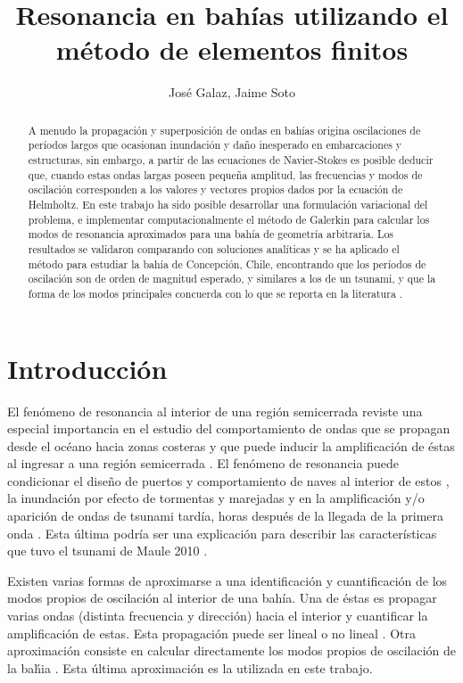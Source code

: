 \documentclass[12pt, letterpaper]{article}
\title{Resonancia en bah\'ias utilizando el m\'etodo de elementos finitos}
\author{Jos\'e Galaz, Jaime Soto}
\date{}
\begin{document}
\maketitle

\begin{abstract}
    A menudo la propagaci\'on y superposici\'on de ondas en bah\'ias origina oscilaciones de per\'iodos largos que ocasionan inundaci\'on y da\~no inesperado en embarcaciones y estructuras, sin embargo, a partir de las ecuaciones de Navier-Stokes es posible deducir que, cuando estas ondas largas poseen peque\~na amplitud, las frecuencias y modos de oscilaci\'on corresponden a los valores y vectores propios dados por la ecuaci\'on de Helmholtz. En este trabajo ha sido posible desarrollar una formulaci\'on variacional del problema, e implementar computacionalmente el m\'etodo de Galerkin para calcular los modos de resonancia aproximados para una bah\'ia de geometr\'ia arbitraria. Los resultados se validaron comparando con soluciones anal\'iticas y se ha aplicado el m\'etodo para estudiar la bah\'ia de Concepci\'on, Chile, encontrando que los per\'iodos de oscilaci\'on son de orden de magnitud esperado, y similares a los de un tsunami, y que la forma de los modos principales concuerda con lo que se reporta en la literatura \cite{Belloti2012}.
\end{abstract}

\section{Introducci\'on}

El fen\'omeno de resonancia al interior de una regi\'on  semicerrada reviste una especial importancia en el estudio del comportamiento de ondas que se propagan desde el oc\'eano hacia zonas costeras y que puede inducir la amplificaci\'on de \'estas al ingresar a una regi\'on semicerrada \cite{Kowalik1993}. El fen\'omeno de resonancia puede condicionar el dise\~no de puertos y comportamiento de naves al interior de estos \cite{Diaz2006web}, la inundaci\'on por efecto de tormentas y marejadas \cite{Kowalik1993} y en la amplificaci\'on y/o aparici\'on de ondas de tsunami tard\'ia, horas despu\'es de la llegada de la primera onda \cite{Kowalik1993}. Esta \'ultima podr\'ia ser una explicaci\'on para describir las caracter\'isticas que tuvo el tsunami de Maule 2010 \cite{Cyper2012web}.

Existen varias formas de aproximarse a una identificaci\'on y cuantificaci\'on de los modos propios de oscilaci\'on al interior de una bah\'ia. Una de \'estas es propagar varias ondas (distinta frecuencia y direcci\'on) hacia el interior y cuantificar la amplificaci\'on de estas. Esta propagaci\'on puede ser lineal o no lineal \cite{Mei2005}. Otra aproximaci\'on consiste en calcular directamente los modos propios de oscilaci\'on de la ba\'hia \cite{Belloti2012, Mei2005}. Esta \'ultima aproximaci\'on es la utilizada en este trabajo.
\end{document}
